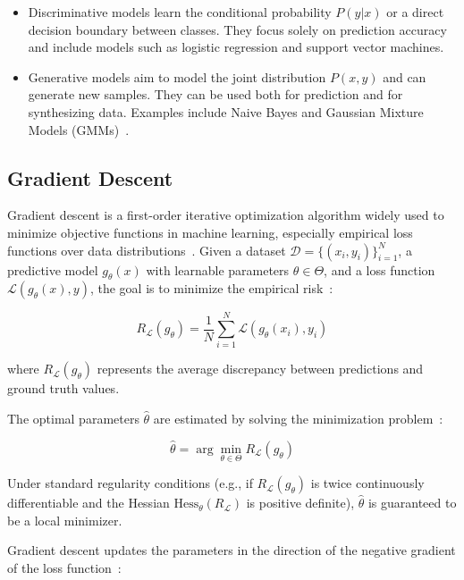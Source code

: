 \begin{itemize}
\item Discriminative models learn the conditional probability $P(y|x)$ or a direct decision boundary between classes. They focus solely on prediction accuracy and include models such as logistic regression and support vector machines.

\item Generative models aim to model the joint distribution $P(x, y)$ and can generate new samples. They can be used both for prediction and for synthesizing data. Examples include Naive Bayes and Gaussian Mixture Models (GMMs)~\cite{bishop2006pattern}.
\end{itemize}
\subsection{Gradient Descent}
Gradient descent is a first-order iterative optimization algorithm widely used to minimize objective functions in machine learning, especially empirical loss functions over data distributions~\cite{gd}. Given a dataset $\mathcal{D} = \{(x_i, y_i)\}_{i=1}^N$, a predictive model $g_{\theta}(x)$ with learnable parameters $\theta \in \Theta$, and a loss function $\mathcal{L}(g_{\theta}(x), y)$, the goal is to minimize the empirical risk~\cite{bottou2012stochastic}:

\begin{equation}
R_{\mathcal{L}}(g_{\theta}) = \frac{1}{N} \sum_{i=1}^{N} \mathcal{L}(g_{\theta}(x_i), y_i)
\end{equation}

where $R_{\mathcal{L}}(g_{\theta})$ represents the average discrepancy between predictions and ground truth values.

The optimal parameters $\hat{\theta}$ are estimated by solving the minimization problem~\cite{ruder2016overview}:

\begin{equation}
\hat{\theta} = \arg \min_{\theta \in \Theta} R_{\mathcal{L}}(g_{\theta})
\end{equation}

Under standard regularity conditions (e.g., if $R_{\mathcal{L}}(g_{\theta})$ is twice continuously differentiable and the Hessian $\text{Hess}_{\theta}(R_{\mathcal{L}})$ is positive definite), $\hat{\theta}$ is guaranteed to be a local minimizer.

Gradient descent updates the parameters in the direction of the negative gradient of the loss function~\cite{lee2016gradient}:

